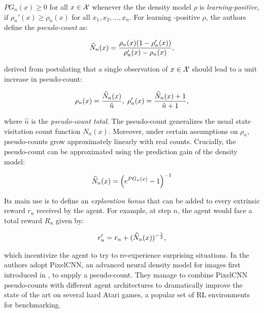$PG_n(x)\geq0$ for all $x\in\mathcal{X}$ whenever the the density model $\rho$ is \emph{learning-positive}, \ie if $\rho_n'(x)\geq\rho_n(x)$ for all $x_1,x_2,\dots,x_n$. For learning -positive $\rho$, the authors define the \emph{pseudo-count} as:

\begin{align}
\widehat{N}_n(x) = \frac{\rho_n(x)(1-\rho_n'(x))}{\rho_n'(x)-\rho_n(x)},
\end{align}

derived from postulating that a single observation of $x\in\mathcal{X}$ should lead to a unit increase in pseudo-count:

\begin{align}
\rho_n(x) = \frac{\widehat{N}_n(x)}{\hat{n}}, \; \rho_n'(x) = \frac{\widehat{N}_n(x)+1}{\hat{n}+1},
\end{align}

where $\hat{n}$ is the \emph{pseudo-count total}. The pseudo-count generalizes the usual state visitation count function $N_n(x)$. Moreover, under certain assumptions on $\rho_n$, pseudo-counts grow approximately linearly with real counts. Crucially, the pseudo-count can be approximated using the prediction gain of the density model:

\begin{align}
\widehat{N}_n(x) = \left(e^{PG_n(x)}-1\right)^{-1}
\end{align}

Its main use is to define an \emph{exploration bonus} that can be added to every extrinsic reward $r_n$ received by the agent. For example, at step $n$, the agent would face a total reward $R_n$ given by:

\begin{align}
r'_n = r_n + (\widehat{N}_n(x))^{-\frac{1}{2}},
\end{align}

which incentivize the agent to try to re-experience surprising situations. In \cite{ostrovski2017count} the authors adopt PixelCNN, an advanced neural density model for images first introduced in \cite{oord2016pixel}, to supply a pseudo-count. They manage to combine PixelCNN pseudo-counts with different agent architectures to dramatically improve the
state of the art on several hard Atari games, a popular set of \gls{RL} environments for  benchmarking. \\

